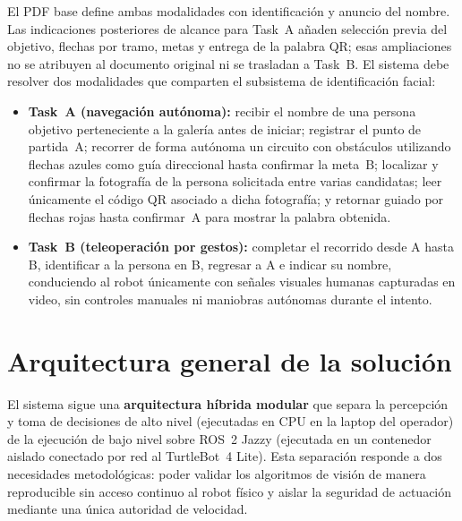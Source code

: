 \documentclass[11pt,a4paper]{article}
\begin{document}
El PDF base define ambas modalidades con identificación y anuncio del nombre.
Las indicaciones posteriores de alcance para Task~A añaden selección previa del
objetivo, flechas por tramo, metas y entrega de la palabra QR; esas ampliaciones
no se atribuyen al documento original ni se trasladan a Task~B. El sistema debe
resolver dos modalidades que comparten el subsistema de identificación facial:
\begin{itemize}
  \item \textbf{Task~A (navegación autónoma):} recibir el nombre de una persona
  objetivo perteneciente a la galería antes de iniciar; registrar el punto de
  partida~A; recorrer de forma autónoma un circuito con obstáculos utilizando
  flechas azules como guía direccional hasta confirmar la meta~B; localizar y
  confirmar la fotografía de la persona solicitada entre varias candidatas;
  leer únicamente el código QR asociado a dicha fotografía; y retornar guiado
  por flechas rojas hasta confirmar~A para mostrar la palabra obtenida.
  \item \textbf{Task~B (teleoperación por gestos):} completar el recorrido
  desde A hasta B, identificar a la persona en B, regresar a A e indicar su
  nombre, conduciendo al robot únicamente con
  señales visuales humanas capturadas en video, sin controles manuales ni
  maniobras autónomas durante el intento.
\end{itemize}

\section{Arquitectura general de la solución}
\label{sec:arquitectura}

El sistema sigue una \textbf{arquitectura híbrida modular} que separa la
percepción y toma de decisiones de alto nivel (ejecutadas en CPU en la laptop
del operador) de la ejecución de bajo nivel sobre ROS~2 Jazzy (ejecutada en un
contenedor aislado conectado por red al TurtleBot~4 Lite). Esta separación
responde a dos necesidades metodológicas: poder validar los algoritmos de
visión de manera reproducible sin acceso continuo al robot físico y aislar la
seguridad de actuación mediante una única autoridad de velocidad.
\end{document}
